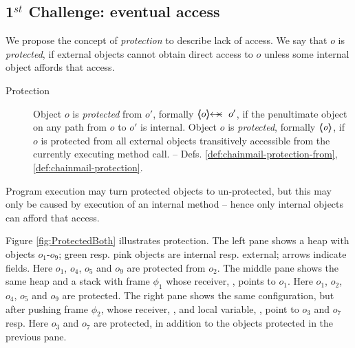  
 
\subsection{1$^{st}$ Challenge: eventual access} 

{We propose  the concept of \emph{protection} to  describe  lack of access. We say that $o$ is \emph{protected}, if external objects  cannot obtain direct access to $o$ unless some internal object affords that access.}

 \begin{description}
\item[Protection] Object $o$ is \emph{protected} from $o'$, formally $\protectedFrom {o} {o'}$,  
 if the penultimate object on any path from $o$ to $o'$  is internal.
Object $o$ is \emph{protected}, formally ${\langle\!\!\langle \mbox{\normalfont{\texttt{\it{o}}}} \rangle\!\!\rangle}$, if $o$ is protected from all external objects transitively accessible from the currently executing method call. %
-- \cf Defs. \ref{def:chainmail-protection-from}, \ %
\ref{def:chainmail-protection}.
 \end{description}
 
 {Program execution may turn protected objects to un-protected, but this may only be caused by execution of an internal method -- hence only internal objects can afford that access.}

Figure \ref{fig:ProtectedBoth} illustrates  protection. {The left pane shows a heap with objects $o_1$-$o_9$; green resp. pink objects are internal resp. external;  arrows indicate fields.} 
Here  $o_1$, $o_4$, $o_5$ and $o_9$ 
are protected from $o_2$. 
 The middle pane {shows the same heap and a stack with frame  $\phi_1$} whose receiver,   ,  points to $o_1$. Here 
 $o_1$, $o_2$, $o_4$, $o_5$ and $o_9$  are protected. 
 The right pane {shows the same configuration, but after pushing frame  $\phi_2$}, whose receiver,  ,  and local variable, , point to $o_3$ and  $o_7$ resp.
 Here $o_3$ and $o_7$ are protected, in addition  to  the objects protected in the previous pane. 



